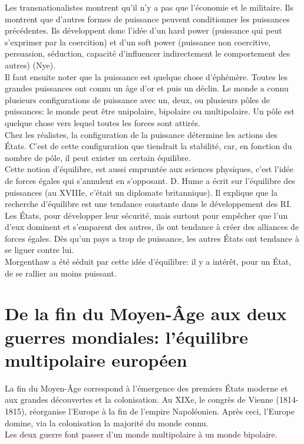 \documentclass[10pt, a4paper, openany]{book}
\begin{document}
Les transnationalistes montrent qu'il n'y a pas que l'économie et le militaire. Ils montrent que d'autres formes de puissance peuvent conditionner les puissances précédentes. Ils développent donc l'idée d'un hard power (puissance qui peut s'exprimer par la coercition) et d'un soft power (puissance non coercitive, persuasion, séduction, capacité d'influencer indirectement le comportement des autres) (Nye). \\
Il faut ensuite noter que la puissance est quelque chose d'éphémère. Toutes les grandes puissances ont connu un âge d'or et puis un déclin. Le monde a connu plusieurs configurations de puissance avec un, deux, ou plusieurs pôles de puissances: le monde peut être unipolaire, bipolaire ou multipolaire. Un pôle est quelque chose vers lequel toutes les forces sont attirés. \\
Chez les réalistes, la configuration de la puissance détermine les actions des États. C'est de cette configuration que tiendrait la stabilité, car, en fonction du nombre de pôle, il peut exister un certain équilibre. \\
Cette notion d'équilibre, est aussi empruntée aux sciences physiques, c'est l'idée de forces égales qui s'annulent en s'opposant. D. Hume a écrit sur l'équilibre des puissances (au XVIIIe, c'était un diplomate britannique). Il explique que la recherche d'équilibre est une tendance constante dans le développement des RI. Les États, pour développer leur sécurité, mais surtout pour empêcher que l'un d'eux dominent et s'emparent des autres, ils ont tendance à créer des alliances de forces égales. Dès qu'un pays a trop de puissance, les autres États ont tendance à se liguer contre lui. \\
Morgenthaw a été séduit par cette idée d'équilibre: il y a intérêt, pour un État, de se rallier au moins puissant. 

\section{De la fin du Moyen-Âge aux deux guerres mondiales: l'équilibre multipolaire européen}

La fin du Moyen-Âge correspond à l'émergence des premiers États moderne et aux grandes découvertes et la colonisation. Au XIXe, le congrès de Vienne (1814-1815), réorganise l'Europe à la fin de l'empire Napoléonien. Après ceci, l'Europe domine, via la colonisation la majorité du monde connu. \\
Les deux guerre font passer d'un monde multipolaire à un monde bipolaire. 
\end{document}
